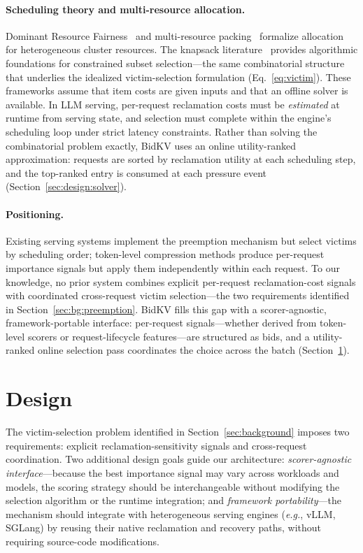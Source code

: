 \documentclass[sigconf,nonacm]{acmart}
\newcommand{\bidkv}{BidKV\xspace}
\newcommand{\eg}{\emph{e.g.},\xspace}
\begin{document}
\paragraph{Scheduling theory and multi-resource allocation.}
Dominant Resource Fairness~\cite{Ghodsi2011} and multi-resource
packing~\cite{Grandl2014} formalize allocation for heterogeneous cluster
resources.
The knapsack literature~\cite{Martello1993, Kellerer2004} provides algorithmic
foundations for constrained subset selection---the same combinatorial structure
that underlies the idealized victim-selection formulation (Eq.~\ref{eq:victim}).
These frameworks assume that item costs are given inputs and that an offline
solver is available.  In LLM serving, per-request reclamation costs must be
\emph{estimated} at runtime from serving state, and selection must complete
within the engine's scheduling loop under strict latency constraints.  Rather
than solving the combinatorial problem exactly, \bidkv uses an online
utility-ranked approximation: requests are sorted by reclamation utility at
each scheduling step, and the top-ranked entry is consumed at each pressure
event (Section~\ref{sec:design:solver}).

\paragraph{Positioning.}
Existing serving systems implement the preemption mechanism but select victims
by scheduling order; token-level compression methods produce per-request
importance signals but apply them independently within each request.
To our knowledge, no prior system combines explicit per-request
reclamation-cost signals with coordinated cross-request victim
selection---the two requirements identified in
Section~\ref{sec:bg:preemption}.
\bidkv fills this gap with a scorer-agnostic, framework-portable interface:
per-request signals---whether derived from token-level scorers or
request-lifecycle features---are structured as bids, and a utility-ranked
online selection pass coordinates the choice across the batch
(Section~\ref{sec:design}).

\section{Design}\label{sec:design}

The victim-selection problem identified in Section~\ref{sec:background}
imposes two requirements: explicit reclamation-sensitivity signals and
cross-request coordination.  Two additional design goals guide our architecture:
\emph{scorer-agnostic interface}---because the best importance signal may vary
across workloads and models, the scoring strategy should be interchangeable
without modifying the selection algorithm or the runtime integration; and
\emph{framework portability}---the mechanism should integrate with heterogeneous
serving engines (\eg vLLM, SGLang) by reusing their native reclamation and
recovery paths, without requiring source-code modifications.
\end{document}
